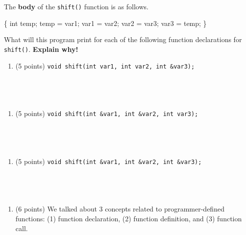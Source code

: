 \documentclass[
]{article}
\newenvironment{Shaded}{}{}
\newcommand{\DataTypeTok}[1]{\textcolor[rgb]{0.56,0.13,0.00}{#1}}
\newcommand{\NormalTok}[1]{#1}
\providecommand{\tightlist}{%
  \setlength{\itemsep}{0pt}\setlength{\parskip}{0pt}}
\begin{document}
The \textbf{body} of the \texttt{shift()} function is as follows.

\begin{Shaded}
\begin{Highlighting}[]
\NormalTok{\{}
    \DataTypeTok{int}\NormalTok{ temp;}
\NormalTok{    temp = var1;}
\NormalTok{    var1 = var2;}
\NormalTok{    var2 = var3;}
\NormalTok{    var3 = temp;}
\NormalTok{\}}
\end{Highlighting}
\end{Shaded}

What will this program print for each of the following function
declarations for \texttt{shift()}. \textbf{Explain why!}

\begin{enumerate}
\def\labelenumi{\alph{enumi}.}
\tightlist
\item
  (5 points) \texttt{void\ shift(int\ var1,\ int\ var2,\ int\ \&var3);}
\end{enumerate}

\begin{verbatim}




\end{verbatim}

\begin{enumerate}
\def\labelenumi{\alph{enumi}.}
\setcounter{enumi}{1}
\tightlist
\item
  (5 points)
  \texttt{void\ shift(int\ \&var1,\ int\ \&var2,\ int\ var3);}
\end{enumerate}

\begin{verbatim}




\end{verbatim}

\begin{enumerate}
\def\labelenumi{\alph{enumi}.}
\setcounter{enumi}{2}
\tightlist
\item
  (5 points)
  \texttt{void\ shift(int\ \&var1,\ int\ \&var2,\ int\ \&var3);}
\end{enumerate}

\begin{verbatim}




\end{verbatim}

\begin{enumerate}
\def\labelenumi{\arabic{enumi}.}
\setcounter{enumi}{6}
\tightlist
\item
  (6 points) We talked about 3 concepts related to programmer-defined
  functions: (1) function declaration, (2) function definition, and (3)
  function call.
\end{enumerate}
\end{document}
